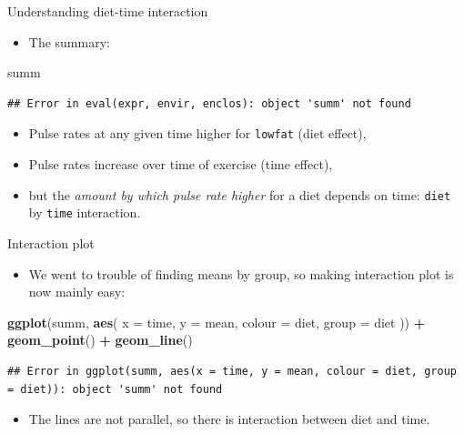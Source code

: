\documentclass[ignorenonframetext,]{beamer}
\newenvironment{Shaded}{\begin{snugshade}}{\end{snugshade}}
\newcommand{\DataTypeTok}[1]{\textcolor[rgb]{0.13,0.29,0.53}{#1}}
\newcommand{\KeywordTok}[1]{\textcolor[rgb]{0.13,0.29,0.53}{\textbf{#1}}}
\newcommand{\NormalTok}[1]{#1}
\newcommand{\OperatorTok}[1]{\textcolor[rgb]{0.81,0.36,0.00}{\textbf{#1}}}
\newcommand{\StringTok}[1]{\textcolor[rgb]{0.31,0.60,0.02}{#1}}
\providecommand{\tightlist}{%
  \setlength{\itemsep}{0pt}\setlength{\parskip}{0pt}}
\begin{document}
\begin{frame}[fragile]{Understanding diet-time interaction}
\protect\hypertarget{understanding-diet-time-interaction}{}

\begin{itemize}
\tightlist
\item
  The summary:
\end{itemize}

\begin{Shaded}
\begin{Highlighting}[]
\NormalTok{summ}
\end{Highlighting}
\end{Shaded}

\begin{verbatim}
## Error in eval(expr, envir, enclos): object 'summ' not found
\end{verbatim}

\begin{itemize}
\item
  Pulse rates at any given time higher for \texttt{lowfat} (diet
  effect),
\item
  Pulse rates increase over time of exercise (time effect),
\item
  but the \emph{amount by which pulse rate higher} for a diet depends on
  time: \texttt{diet} by \texttt{time} interaction.
\end{itemize}

\end{frame}

\begin{frame}[fragile]{Interaction plot}
\protect\hypertarget{interaction-plot-4}{}

\begin{itemize}
\tightlist
\item
  We went to trouble of finding means by group, so making interaction
  plot is now mainly easy:
\end{itemize}

\begin{Shaded}
\begin{Highlighting}[]
\KeywordTok{ggplot}\NormalTok{(summ, }\KeywordTok{aes}\NormalTok{(}
  \DataTypeTok{x =}\NormalTok{ time, }\DataTypeTok{y =}\NormalTok{ mean, }\DataTypeTok{colour =}\NormalTok{ diet,}
  \DataTypeTok{group =}\NormalTok{ diet}
\NormalTok{)) }\OperatorTok{+}\StringTok{ }\KeywordTok{geom_point}\NormalTok{() }\OperatorTok{+}\StringTok{ }\KeywordTok{geom_line}\NormalTok{()}
\end{Highlighting}
\end{Shaded}

\begin{verbatim}
## Error in ggplot(summ, aes(x = time, y = mean, colour = diet, group = diet)): object 'summ' not found
\end{verbatim}

\begin{itemize}
\tightlist
\item
  The lines are not parallel, so there is interaction between diet and
  time.
\end{itemize}

\end{frame}
\end{document}

